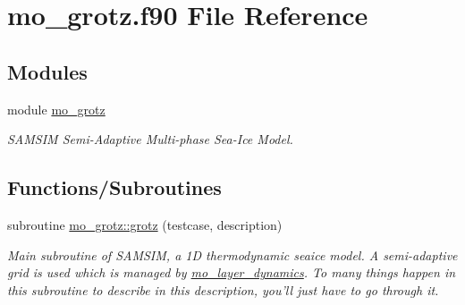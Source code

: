 \hypertarget{mo__grotz_8f90}{
\section{mo\_\-grotz.f90 File Reference}
\label{mo__grotz_8f90}
}
\subsection*{Modules}
\begin{DoxyCompactItemize}
\item 
module \hyperlink{namespacemo__grotz}{mo\_\-grotz}


\begin{DoxyCompactList}\small\item\em SAMSIM Semi-\/Adaptive Multi-\/phase Sea-\/Ice Model. \item\end{DoxyCompactList}

\end{DoxyCompactItemize}
\subsection*{Functions/Subroutines}
\begin{DoxyCompactItemize}
\item 
subroutine \hyperlink{namespacemo__grotz_a48ebd3aa83db1cb4087b1841142ec9bd}{mo\_\-grotz::grotz} (testcase, description)
\begin{DoxyCompactList}\small\item\em Main subroutine of SAMSIM, a 1D thermodynamic seaice model. A semi-\/adaptive grid is used which is managed by \hyperlink{namespacemo__layer__dynamics}{mo\_\-layer\_\-dynamics}. To many things happen in this subroutine to describe in this description, you'll just have to go through it. \item\end{DoxyCompactList}\end{DoxyCompactItemize}
